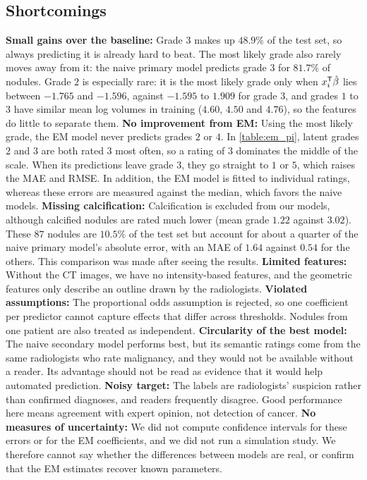 \documentclass[12pt]{article}
\begin{document}
\subsection{Shortcomings}

\begin{itemize}
    \ii \textbf{Small gains over the baseline:} Grade $3$ makes up $48.9\%$
    of the test set, so always predicting it is already hard to beat.
    The most likely grade also rarely moves away from it: the naive primary
    model predicts grade $3$ for $81.7\%$ of nodules.
    Grade $2$ is especially rare: it is the most likely grade only when
    $x_i^{\mathsf{T}}\hat{\beta}$ lies between $-1.765$ and $-1.596$, against
    $-1.595$ to $1.909$ for grade $3$, and grades $1$ to $3$ have similar mean
    log volumes in training ($4.60$, $4.50$ and $4.76$), so the features do
    little to separate them.
    \ii \textbf{No improvement from EM:} Using the most likely grade, the EM
    model never predicts grades $2$ or $4$. In \cref{table:em_pi}, latent
    grades $2$ and $3$ are both rated $3$ most often, so a rating of $3$
    dominates the middle of the scale. When its predictions leave grade $3$,
    they go straight to $1$ or $5$, which raises the MAE and RMSE. In
    addition, the
    EM model is fitted to individual ratings, whereas these errors are measured
    against the median, which favors the naive models.
    \ii \textbf{Missing calcification:} Calcification is excluded from our
    models, although calcified nodules are rated much lower (mean grade $1.22$
    against $3.02$). These $87$ nodules are $10.5\%$ of the test set but
    account for about a quarter of the naive primary model's absolute error,
    with an MAE of $1.64$ against $0.54$ for the others. This comparison was
    made after seeing the results.
    \ii \textbf{Limited features:} Without the CT images, we have no
    intensity-based features, and the geometric features only describe an
    outline drawn by the radiologists.
    \ii \textbf{Violated assumptions:} The proportional odds assumption is
    rejected, so one coefficient per predictor cannot capture effects that
    differ across thresholds. Nodules from one patient are also treated as
    independent.
    \ii \textbf{Circularity of the best model:} The naive secondary model
    performs best, but its semantic ratings come from the same radiologists
    who rate malignancy, and they would not be available without a reader.
    Its advantage should not be read as evidence that it would help
    automated prediction.
    \ii \textbf{Noisy target:} The labels are radiologists' suspicion rather
    than confirmed diagnoses, and readers frequently disagree. Good performance
    here means agreement with expert opinion, not detection of cancer.
    \ii \textbf{No measures of uncertainty:} We did not compute confidence
    intervals for these errors or for the EM coefficients, and we did not
    run a simulation study. We therefore cannot say whether the differences
    between models are real, or confirm that the EM estimates recover known
    parameters.
\end{itemize}
\end{document}
